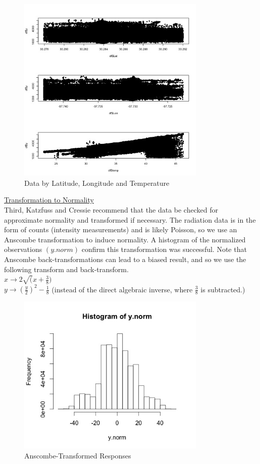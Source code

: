 \documentclass[11pt]{article}
\newcommand{\myindent}{\hspace*{1cm}}
\begin{document}
\begin{figure}[!ht]
\centering
\includegraphics[width=90mm,keepaspectratio]{Images/detrending_plots.jpg}
\caption{Data by Latitude, Longitude and Temperature \label{fig:2}}
\end{figure}

\underline{Transformation to Normality}\\
Third, Katzfuss and Cressie recommend that the data be checked for approximate normality and transformed if necessary.  The radiation data is in the form of counts (intensity measurements) and is likely Poisson, so we use an Anscombe transformation to induce normality.  A histogram of the normalized observations $(y.norm)$ confirm this transformation was successful.  Note that Anscombe back-transformations can lead to a biased result, and so we use the following transform and back-transform. \\

\myindent $x \rightarrow 2\sqrt(x + \frac{3}{8})$\\
\myindent $y \rightarrow \left(\frac{y}{2}\right)^2 - \frac{1}{8}$ 
\myindent (instead of the direct algebraic inverse, where $\frac{3}{8}$ is subtracted.)

\begin{figure}[!ht]
\centering
\includegraphics[width=90mm,keepaspectratio]{Images/histogram_ynorm.jpg}
\caption{Anscombe-Transformed Responses \label{fig:3}}
\end{figure}
\end{document}
